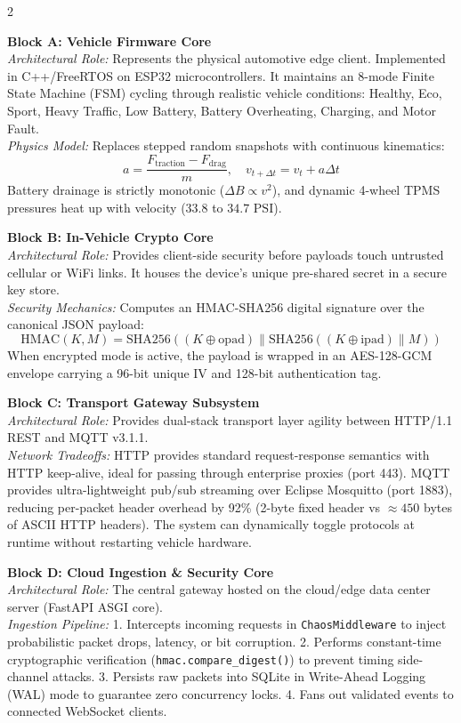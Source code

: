 \documentclass[10pt,a4paper]{article}
\begin{document}
\vspace{-4pt}
\begin{multicols}{2}
\scriptsize

\textbf{\textcolor{cvisblue}{Block A: Vehicle Firmware Core}}\\
\textit{Architectural Role:} Represents the physical automotive edge client. Implemented in C++/FreeRTOS on ESP32 microcontrollers. It maintains an 8-mode Finite State Machine (FSM) cycling through realistic vehicle conditions: Healthy, Eco, Sport, Heavy Traffic, Low Battery, Battery Overheating, Charging, and Motor Fault.\\
\textit{Physics Model:} Replaces stepped random snapshots with continuous kinematics:
\[
a = \frac{F_{\text{traction}} - F_{\text{drag}}}{m}, \quad v_{t+\Delta t} = v_t + a\Delta t
\]
Battery drainage is strictly monotonic ($\Delta B \propto v^2$), and dynamic 4-wheel TPMS pressures heat up with velocity ($33.8$ to $34.7\text{ PSI}$).

\textbf{\textcolor{cvisred}{Block B: In-Vehicle Crypto Core}}\\
\textit{Architectural Role:} Provides client-side security before payloads touch untrusted cellular or WiFi links. It houses the device's unique pre-shared secret in a secure key store.\\
\textit{Security Mechanics:} Computes an HMAC-SHA256 digital signature over the canonical JSON payload:
\[
\text{HMAC}(K, M) = \text{SHA256}((K \oplus \text{opad}) \parallel \text{SHA256}((K \oplus \text{ipad}) \parallel M))
\]
When encrypted mode is active, the payload is wrapped in an AES-128-GCM envelope carrying a 96-bit unique IV and 128-bit authentication tag.

\textbf{\textcolor{cvisorange}{Block C: Transport Gateway Subsystem}}\\
\textit{Architectural Role:} Provides dual-stack transport layer agility between HTTP/1.1 REST and MQTT v3.1.1.\\
\textit{Network Tradeoffs:} HTTP provides standard request-response semantics with HTTP keep-alive, ideal for passing through enterprise proxies (port 443). MQTT provides ultra-lightweight pub/sub streaming over Eclipse Mosquitto (port 1883), reducing per-packet header overhead by 92\% (2-byte fixed header vs $\approx 450$ bytes of ASCII HTTP headers). The system can dynamically toggle protocols at runtime without restarting vehicle hardware.

\textbf{\textcolor{cvisgreen}{Block D: Cloud Ingestion \& Security Core}}\\
\textit{Architectural Role:} The central gateway hosted on the cloud/edge data center server (FastAPI ASGI core).\\
\textit{Ingestion Pipeline:} 1. Intercepts incoming requests in \texttt{ChaosMiddleware} to inject probabilistic packet drops, latency, or bit corruption. 2. Performs constant-time cryptographic verification (\texttt{hmac.compare\_digest()}) to prevent timing side-channel attacks. 3. Persists raw packets into SQLite in Write-Ahead Logging (WAL) mode to guarantee zero concurrency locks. 4. Fans out validated events to connected WebSocket clients.


\end{multicols}
\end{document}
